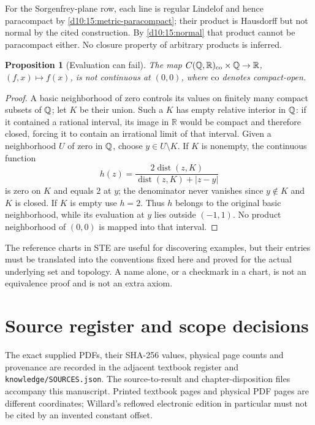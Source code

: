 \documentclass[11pt,oneside,openany]{book}
\newtheorem{proposition}[theorem]{Proposition}
\theoremstyle{definition}
\theoremstyle{remark}
\newcommand{\R}{\mathbb R}\newcommand{\C}{\mathbb C}
\DeclareMathOperator{\dist}{dist}
\begin{document}
For the Sorgenfrey-plane row, each line is regular Lindelof and hence
paracompact by \cref{d10:15:metric-paracompact}; their product is Hausdorff
but not normal by the cited construction. By \cref{d10:15:normal}
that product cannot be paracompact either. No closure property of
arbitrary products is inferred.

\begin{proposition}[Evaluation can fail]\label{d10:18:evaluation-failure}
The map $C(\Q,\R)_{\mathrm{co}}\times\Q\to\R$, $(f,x)\mapsto f(x)$,
is not continuous at $(0,0)$, where $\mathrm{co}$ denotes compact-open.
\end{proposition}
\begin{proof}
A basic neighborhood of zero controls its values on finitely many
compact subsets of $\mathbb Q$; let $K$ be their union. Such a $K$ has empty
relative interior in $\mathbb Q$: if it contained a rational interval, its
image in $\R$ would be compact and therefore closed, forcing it
to contain an irrational limit of that interval.
Given a neighborhood $U$ of zero in $\mathbb Q$, choose $y\in U\setminus K$.
If $K$ is nonempty, the continuous function
\[
 h(z)=\frac{2\dist(z,K)}{\dist(z,K)+|z-y|}
\]
is zero on $K$ and equals $2$ at $y$; the denominator never vanishes
since $y\notin K$ and $K$ is closed. If $K$ is empty use $h=2$.
Thus $h$ belongs to the original basic neighborhood, while its
evaluation at $y$ lies outside $(-1,1)$. No product neighborhood
of $(0,0)$ is mapped into that interval.
\end{proof}

The reference charts in STE are useful for discovering examples, but their
entries must be translated into the conventions fixed here and proved for
the actual underlying set and topology. A name alone, or a checkmark in a
chart, is not an equivalence proof and is not an extra axiom.


\backmatter

\chapter{Source register and scope decisions}
\label{app:d10-sources}
The exact supplied PDFs, their SHA-256 values, physical page counts and
provenance are recorded in the adjacent textbook register and
\texttt{knowledge/SOURCES.json}. The source-to-result and chapter-disposition
files accompany this manuscript. Printed textbook pages and physical PDF
pages are different coordinates; Willard's reflowed electronic edition in
particular must not be cited by an invented constant offset.
\end{document}
